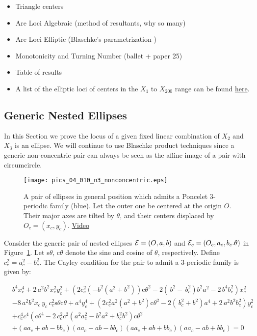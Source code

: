 \begin{itemize}
    \item Triangle centers
    \item Are Loci Algebraic (method of resultants, why so many)
    \item Are Loci Elliptic (Blaschke's parametrization \cite{daepp-2019})
    \item Monotonicity and Turning Number (ballet + paper 25)
    \item Table of results
    \item A list of the elliptic loci of centers in the $X_{1}$ to $X_{200}$ range can be found \href{https://dan-reznik.github.io/why-so-many-ellipses/}{here}.
\end{itemize}

\subsection{Generic Nested Ellipses}
 
 In this Section we prove the locus of a given fixed linear combination of $X_2$ and $X_3$ is an ellipse. We will continue to use Blaschke product techniques since a generic non-concentric pair can always be seen as the affine image of a pair with circumcircle.

\begin{figure}
    \centering
    \texttt{[image: pics\_04\_010\_n3\_nonconcentric.eps]}
    \caption{A pair of ellipses in general position which admits a Poncelet 3-periodic family (blue). Let the outer one be centered at the origin $O$. Their major axes are tilted by $\theta$, and their centers displaced by $O_c=(x_c,y_c)$. \href{https://youtu.be/bjHpXVyXXVc}{Video}}
    \label{fig:04-n3-nonconcentric}
\end{figure}

Consider the generic pair of nested ellipses $\mathcal{E}=(O,a,b)$ and $\mathcal{E}_c=(O_c,a_c,b_c.\theta)$ in Figure~\ref{fig:04-n3-nonconcentric}. Let s$\theta$, c$\theta$ denote the sine and cosine of $\theta$, respectively. Define $c_c^2=a_c^2-b_c^2$. The Cayley condition for the pair to admit a 3-periodic family is given by:

{\small
\begin{align}
&{b}^{4}x_c^{4}+2\,{a}^{2}{b}^{2}x_c^{2}y_c^{2}+
 \left(  2 c_c^2  \left( -{b}^{2}({a}^{2}+{b}^{2} )\right)  \text{c}\theta^2  - 2\left(  \,b ^{2}- \,b_c
^{2} \right) {b}^{2}{a}^{2}-2\,{b}^{4}b_c^{2} \right)x_c
^{2} \label{eqn:cayley}\\
&-8\,{a}^{2}{b}^{2}x_c\,{  y_c}\,c_c^2 
\text{s}\theta\text{c}\theta  +{a}^{4}y_c^{4} + \left(  2 c_c^2 a^2 \left(
{a}^{2}+{b}^{2}  \right)\text{c}\theta^2  
 -2 \left(  \,b_c^{2}+{b}^{2} \right) {a}^{4}+2
\,{a}^{2}{b}^{2}b_c^{2} \right) y_c^{2} \nonumber\\
&+ c_c^4  c^4  \left( \text{c}\theta^4-2\, c_c^2 c^2
  \left( {a}^{2} a_c^{2}-{b}^{2}{a}^{2}+
b_c^{2}{b}^{2} \right) \text{c}\theta^2 \right. \nonumber\\
 &+ \left( a a_c+a b-b b_c \right)  \left( a a_c
-a b -b b_c \right)  \left( a a_c+a b+b b_c \right)  \left( a
a_c-a b+b b_c \right) = 0\nonumber
\end{align}
}


